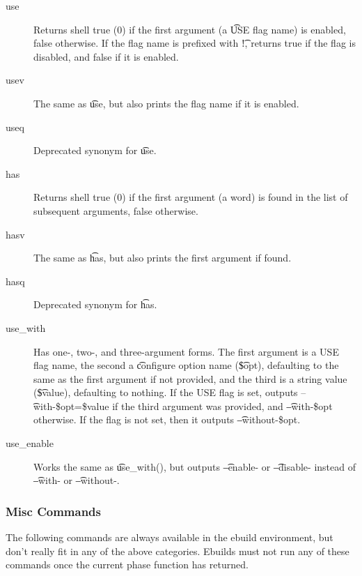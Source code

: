 \begin{description}
\item[use] Returns shell true (0) if the first argument (a \t{USE} flag name) is enabled, false
    otherwise.  If the flag name is prefixed with \t{!}, returns true if the flag is disabled, and
    false if it is enabled.
\item[usev] The same as \t{use}, but also prints the flag name if it is enabled.
\item[useq] Deprecated synonym for \t{use}.
\\
\item[has] Returns shell true (0) if the first argument (a word) is found in the list of subsequent
    arguments, false otherwise.
\item[hasv] The same as \t{has}, but also prints the first argument if found.
\item[hasq] Deprecated synonym for \t{has}.
\\
\item[use\_with] Has one-, two-, and three-argument forms. The first argument is a USE flag name,
    the second a \t{configure} option name (\t{\$opt}), defaulting to the same as the first argument
    if not provided, and the third is a string value (\t{\$value}), defaulting to nothing. If the
    USE flag is set, outputs \t{--with-\$opt=\$value} if the third argument was provided, and
    \t{--with-\$opt} otherwise. If the flag is not set, then it outputs \t{--without-\$opt}.

\item[use\_enable] Works the same as \t{use\_with()}, but outputs \t{--enable-} or \t{--disable-}
instead of \t{--with-} or \t{--without-}.
\end{description}

\subsubsection{Misc Commands}
The following commands are always available in the ebuild environment, but don't really fit in any
of the above categories. Ebuilds must not run any of these commands once the current phase function
has returned.

